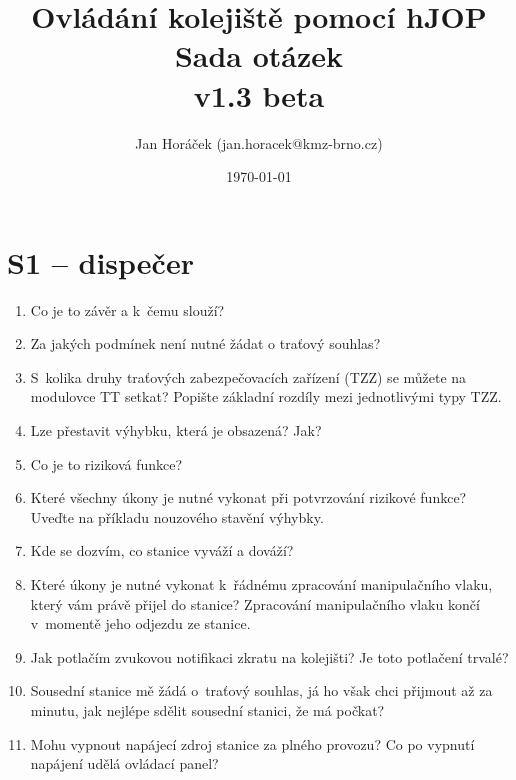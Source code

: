 \documentclass[12pt,a4paper]{article}
\begin{document}
\thispagestyle{empty}
\noindent

\title{
\Large Ovládání kolejiště pomocí hJOP\\
\LARGE Sada otázek\\
\small v1.3 beta}
\author{Jan Horáček (jan.horacek@kmz-brno.cz)}
\date{\today}
\maketitle

\section*{S1 – dispečer}

\begin{enumerate}[leftmargin=*]
	\item Co je to závěr a k~čemu slouží?

	\item Za jakých podmínek není nutné žádat o traťový souhlas?

	\item S~kolika druhy traťových zabezpečovacích zařízení (TZZ) se můžete na modulovce TT setkat? Popište základní rozdíly mezi jednotlivými typy TZZ.

	\item Lze přestavit výhybku, která je obsazená? Jak?

	\item Co je to riziková funkce?

	\item Které všechny úkony je nutné vykonat při potvrzování rizikové funkce? Uveďte na příkladu nouzového stavění výhybky.

	\item Kde se dozvím, co stanice vyváží a dováží?

	\item Které úkony je nutné vykonat k~řádnému zpracování manipulačního vlaku, který vám právě přijel do stanice? Zpracování manipulačního vlaku končí v~momentě jeho odjezdu ze stanice.

	\item Jak potlačím zvukovou notifikaci zkratu na kolejišti? Je toto potlačení trvalé?

	\item Sousední stanice mě žádá o~traťový souhlas, já ho však chci přijmout až za minutu, jak nejlépe sdělit sousední stanici, že má počkat?

	\item Mohu vypnout napájecí zdroj stanice za plného provozu? Co po vypnutí napájení udělá ovládací panel?


\end{enumerate}
\end{document}
